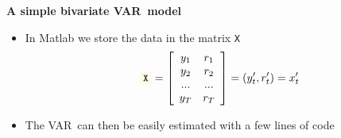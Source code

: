 
\begin{frame}
{\textbf{A simple bivariate VAR\ model}}\medskip

\begin{itemize}
\item In Matlab we store the data in the matrix \colorbox{script!80}{\small%
\texttt{X}}%
\begin{equation*}
\text{\colorbox{script!80}{\small\texttt{X}}}=\left[ 
\begin{array}{cc}
y_{1} & r_{1} \\ 
y_{2} & r_{2} \\ 
... & ... \\ 
y_{T} & r_{T}%
\end{array}%
\right] =\left( y_{t}^{\prime },r_{t}^{\prime }\right) =x_{t}^{\prime }
\end{equation*}

\item The VAR\ can then be easily estimated with a few lines of code\medskip

\begin{minipage}[b]{.9\textwidth}
\end{minipage}
\end{itemize}
\end{frame}



